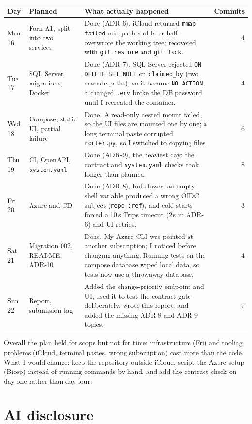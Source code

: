 \documentclass[10pt,a4paper]{article}
\newcommand{\code}[1]{\texttt{#1}}
\begin{document}
\begin{tabularx}{\textwidth}{@{}l l X r@{}}
\toprule
\textbf{Day} & \textbf{Planned} & \textbf{What actually happened} & \textbf{Commits}\\
\midrule
Mon 16 & Fork A1, split into two services & Done (ADR-6). iCloud returned \code{mmap failed} mid-push and later half-overwrote the working tree; recovered with \code{git restore} and \code{git fsck}. & 4\\
Tue 17 & SQL Server, migrations, Docker & Done (ADR-7). SQL Server rejected \code{ON DELETE SET NULL} on \code{claimed\_by} (two cascade paths), so it became \code{NO ACTION}; a changed \code{.env} broke the DB password until I recreated the container. & 4\\
Wed 18 & Compose, static UI, partial failure & Done. A read-only nested mount failed, so the UI files are mounted one by one; a long terminal paste corrupted \code{router.py}, so I switched to copying files. & 6\\
Thu 19 & CI, OpenAPI, \code{system.yaml} & Done (ADR-9), the heaviest day: the contract and \code{system.yaml} checks took longer than planned. & 8\\
Fri 20 & Azure and CD & Done (ADR-8), but slower: an empty shell variable produced a wrong OIDC subject (\code{repo::ref}), and cold starts forced a 10\,s Trips timeout (2\,s in ADR-6) and UI retries. & 3\\
Sat 21 & Migration 002, README, ADR-10 & Done. My Azure CLI was pointed at another subscription; I noticed before changing anything. Running tests on the compose database wiped local data, so tests now use a throwaway database. & 4\\
Sun 22 & Report, submission tag & Added the change-priority endpoint and UI, used it to test the contract gate deliberately, wrote this report, and added the missing ADR-8 and ADR-9 topics. & 7\\
\bottomrule
\end{tabularx}

Overall the plan held for scope but not for time: infrastructure (Fri) and tooling problems (iCloud, terminal pastes, wrong subscription)
cost more than the code. What I would change: keep the repository outside iCloud, script the Azure setup (Bicep) instead of
running commands by hand, and add the contract check on day one rather than day four.

\section{AI disclosure}
\end{document}
